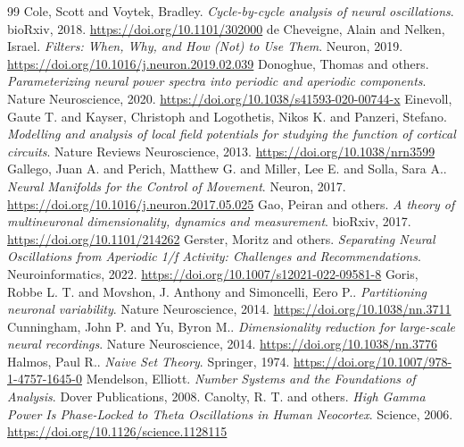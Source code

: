 \begin{thebibliography}{99}
 Cole, Scott and Voytek, Bradley. \emph{Cycle-by-cycle analysis of neural oscillations}. bioRxiv, 2018. \url{https://doi.org/10.1101/302000}
 de Cheveigne, Alain and Nelken, Israel. \emph{Filters: When, Why, and How (Not) to Use Them}. Neuron, 2019. \url{https://doi.org/10.1016/j.neuron.2019.02.039}
 Donoghue, Thomas and others. \emph{Parameterizing neural power spectra into periodic and aperiodic components}. Nature Neuroscience, 2020. \url{https://doi.org/10.1038/s41593-020-00744-x}
 Einevoll, Gaute T. and Kayser, Christoph and Logothetis, Nikos K. and Panzeri, Stefano. \emph{Modelling and analysis of local field potentials for studying the function of cortical circuits}. Nature Reviews Neuroscience, 2013. \url{https://doi.org/10.1038/nrn3599}
 Gallego, Juan A. and Perich, Matthew G. and Miller, Lee E. and Solla, Sara A.. \emph{Neural Manifolds for the Control of Movement}. Neuron, 2017. \url{https://doi.org/10.1016/j.neuron.2017.05.025}
 Gao, Peiran and others. \emph{A theory of multineuronal dimensionality, dynamics and measurement}. bioRxiv, 2017. \url{https://doi.org/10.1101/214262}
 Gerster, Moritz and others. \emph{Separating Neural Oscillations from Aperiodic 1/f Activity: Challenges and Recommendations}. Neuroinformatics, 2022. \url{https://doi.org/10.1007/s12021-022-09581-8}
 Goris, Robbe L. T. and Movshon, J. Anthony and Simoncelli, Eero P.. \emph{Partitioning neuronal variability}. Nature Neuroscience, 2014. \url{https://doi.org/10.1038/nn.3711}
 Cunningham, John P. and Yu, Byron M.. \emph{Dimensionality reduction for large-scale neural recordings}. Nature Neuroscience, 2014. \url{https://doi.org/10.1038/nn.3776}
 Halmos, Paul R.. \emph{Naive Set Theory}. Springer, 1974. \url{https://doi.org/10.1007/978-1-4757-1645-0}
 Mendelson, Elliott. \emph{Number Systems and the Foundations of Analysis}. Dover Publications, 2008. 
 Canolty, R. T. and others. \emph{High Gamma Power Is Phase-Locked to Theta Oscillations in Human Neocortex}. Science, 2006. \url{https://doi.org/10.1126/science.1128115}
\end{thebibliography}